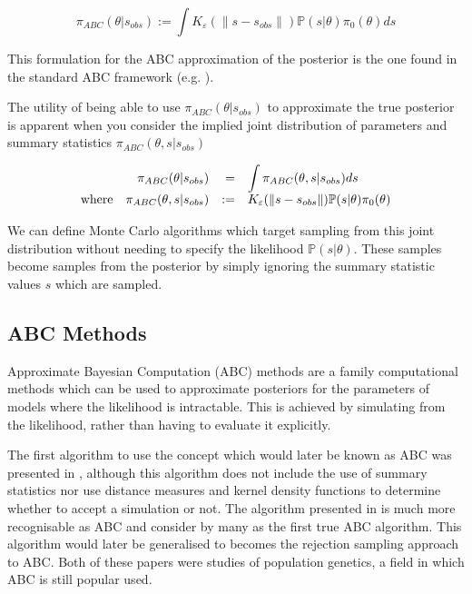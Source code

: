 \documentclass[11pt,a4paper]{article}
\newcommand*{\prob}{\mathbb{P}}
\theoremstyle{break}
\begin{document}
  \[ \pi_{ABC}(\theta|s_{obs}):=\int K_\varepsilon(\|s-s_{obs}\|)\prob(s|\theta)\pi_0(\theta)ds \]

  This formulation for the ABC approximation of the posterior is the one found in the standard ABC framework (e.g. \cite[]{overview_of_abc,annual_review_of_statistics_ABC}).

  \par The utility of being able to use $\pi_{ABC}(\theta|s_{obs})$ to approximate the true posterior is apparent when you consider the implied joint distribution of parameters and summary statistics $\pi_{ABC}(\theta,s|s_{obs})$

  \[\everymath={\displaystyle}\begin{array}{rrrl}
    &\pi_{ABC}(\theta|s_{obs})&=&\int \pi_{ABC}(\theta,s|s_{obs})ds\\
    \text{where}&\pi_{ABC}(\theta,s|s_{obs})&:=&K_\varepsilon(\|s-s_{obs}\|)\prob(s|\theta)\pi_0(\theta)
  \end{array}\]

  We can define Monte Carlo algorithms which target sampling from this joint distribution without needing to specify the likelihood $\prob(s|\theta)$. These samples become samples from the posterior by simply ignoring the summary statistic values $s$ which are sampled.

\subsection{ABC Methods}\label{sec_ABC_ABC_methods}


  \par Approximate Bayesian Computation (ABC) methods are a family computational methods which can be used to approximate posteriors for the parameters of models where the likelihood is intractable. This is achieved by simulating from the likelihood, rather than having to evaluate it explicitly.

  \par The first algorithm to use the concept which would later be known as ABC was presented in \cite[]{inferring_coalescence_times_from_dna_sequence_data}, although this algorithm does not include the use of summary statistics nor use distance measures and kernel density functions to determine whether to accept a simulation or not. The algorithm presented in \cite[]{population_growth_of_human_Y_chromosomes} is much more recognisable as ABC and consider by many as the first true ABC algorithm. This algorithm would later be generalised to becomes the rejection sampling approach to ABC. Both of these papers were studies of population genetics, a field in which ABC is still popular used.
\end{document}
